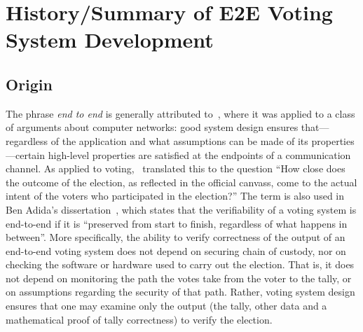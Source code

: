 \chapter{History/Summary of E2E Voting System Development}

\section{Origin}

The phrase \emph{end to end} is generally attributed to~\cite{saltzer1981},
where it was applied to a class of arguments about computer networks: good
system design ensures that---regardless of the application and what
assumptions can be made of its properties---certain high-level properties
are satisfied at the endpoints of a communication channel.  As applied to
voting, \cite{jones2002}~translated this to the question ``How close does the
outcome of the election, as reflected in the official canvass, come to the
actual intent of the voters who participated in the election?'' The term is
also used in Ben Adida's dissertation~\cite{adida2006}, which states that
the verifiability of a voting system is end-to-end if it is ``preserved from
start to finish, regardless of what happens in between''. More specifically,
the ability to verify correctness of the output of an end-to-end voting
system does not depend on securing chain of custody, nor on checking the
software or hardware used to carry out the election. That is, it does not
depend on monitoring the path the votes take from the voter to the tally, or
on assumptions regarding the security of that path. Rather, voting system
design ensures that one may examine only the output (the tally, other data
and a mathematical proof of tally correctness) to verify the election.

